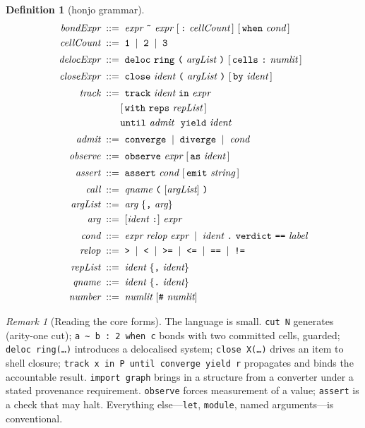 \documentclass[11pt,twocolumn,a4paper]{article}
\theoremstyle{thmstyle}
\theoremstyle{definition}
\newtheorem{definition}[theorem]{Definition}
\theoremstyle{remark}
\newtheorem{remark}[theorem]{Remark}
\newcommand{\bnf}{\;::=\;}
\newcommand{\alt}{\;\mid\;}
\newcommand{\hj}[1]{\texttt{#1}}
\begin{document}
\begin{definition}[honjo grammar]
\begin{align*}
\textit{bondExpr} &\bnf \textit{expr}\ \hj{\~{}}\ \textit{expr}\
   [\,\hj{:}\ \textit{cellCount}\,]\ [\,\hj{when}\ \textit{cond}\,] \\
\textit{cellCount} &\bnf \hj{1} \alt \hj{2} \alt \hj{3} \\[2pt]
\textit{delocExpr} &\bnf \hj{deloc}\ \hj{ring}\ \hj{(}\
   \textit{argList}\ \hj{)}\ [\,\hj{cells}\ \hj{:}\ \textit{numlit}\,] \\[2pt]
\textit{closeExpr} &\bnf \hj{close}\ \textit{ident}\ \hj{(}\
   \textit{argList}\ \hj{)}\ [\,\hj{by}\ \textit{ident}\,] \\[2pt]
\textit{track} &\bnf \hj{track}\ \textit{ident}\ \hj{in}\ \textit{expr} \\
   &\qquad [\,\hj{with}\ \hj{reps}\ \textit{repList}\,]\ \\
   &\qquad \hj{until}\ \textit{admit}\ \ \hj{yield}\ \textit{ident} \\[2pt]
\textit{admit} &\bnf \hj{converge} \alt \hj{diverge} \alt \textit{cond} \\[2pt]
\textit{observe} &\bnf \hj{observe}\ \textit{expr}\
   [\,\hj{as}\ \textit{ident}\,] \\[2pt]
\textit{assert} &\bnf \hj{assert}\ \textit{cond}\
   [\,\hj{emit}\ \textit{string}\,] \\[2pt]
\textit{call} &\bnf \textit{qname}\ \hj{(}\ [\textit{argList}]\ \hj{)} \\
\textit{argList} &\bnf \textit{arg}\ \{\hj{,}\ \textit{arg}\} \\
\textit{arg} &\bnf [\textit{ident}\ \hj{:}]\ \textit{expr} \\[2pt]
\textit{cond} &\bnf \textit{expr}\ \textit{relop}\ \textit{expr}
   \alt \textit{ident}\ \hj{.}\ \hj{verdict}\ \hj{==}\ \textit{label} \\
\textit{relop} &\bnf \hj{>} \alt \hj{<} \alt \hj{>=} \alt \hj{<=}
   \alt \hj{==} \alt \hj{!=} \\[2pt]
\textit{repList} &\bnf \textit{ident}\ \{\hj{,}\ \textit{ident}\} \\
\textit{qname} &\bnf \textit{ident}\ \{\hj{.}\ \textit{ident}\} \\
\textit{number} &\bnf \textit{numlit}\ [\hj{\#}\ \textit{numlit}]
\end{align*}
\end{definition}

\begin{remark}[Reading the core forms]
\label{rem:core-forms}
The language is small. \hj{cut N} generates (arity-one cut);
\hj{a \~{} b : 2 when c} bonds with two committed cells, guarded;
\hj{deloc ring(\ldots)} introduces a delocalised system;
\hj{close X(\ldots)} drives an item to shell closure;
\hj{track x in P until converge yield r} propagates and binds the
accountable result. \hj{import graph} brings in a structure from a
converter under a stated provenance requirement.
\hj{observe} forces measurement of a value; \hj{assert} is a check that
may halt. Everything else---\hj{let}, \hj{module}, named
arguments---is conventional.
\end{remark}
\end{document}
